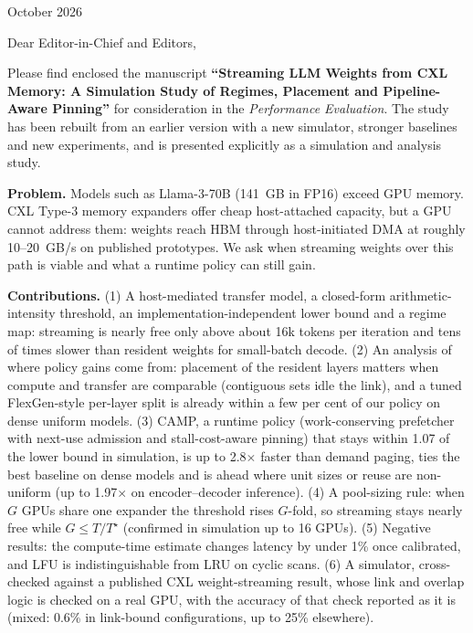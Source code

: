 \documentclass[11pt]{article}
\begin{document}
\begin{flushright}October 2026\end{flushright}

Dear Editor-in-Chief and Editors,

Please find enclosed the manuscript \textbf{``Streaming LLM Weights from CXL Memory: A Simulation Study of Regimes, Placement and Pipeline-Aware Pinning''} for consideration in the \emph{Performance Evaluation}. The study has been rebuilt from an earlier version with a new simulator, stronger baselines and new experiments, and is presented explicitly as a simulation and analysis study.

\textbf{Problem.} Models such as Llama-3-70B (141~GB in FP16) exceed GPU memory. CXL Type-3 memory expanders offer cheap host-attached capacity, but a GPU cannot address them: weights reach HBM through host-initiated DMA at roughly 10--20~GB/s on published prototypes. We ask when streaming weights over this path is viable and what a runtime policy can still gain.

\textbf{Contributions.} (1) A host-mediated transfer model, a closed-form arithmetic-intensity threshold, an implementation-independent lower bound and a regime map: streaming is nearly free only above about 16k tokens per iteration and tens of times slower than resident weights for small-batch decode. (2) An analysis of where policy gains come from: placement of the resident layers matters when compute and transfer are comparable (contiguous sets idle the link), and a tuned FlexGen-style per-layer split is already within a few per cent of our policy on dense uniform models. (3) CAMP, a runtime policy (work-conserving prefetcher with next-use admission and stall-cost-aware pinning) that stays within 1.07 of the lower bound in simulation, is up to 2.8$\times$ faster than demand paging, ties the best baseline on dense models and is ahead where unit sizes or reuse are non-uniform (up to 1.97$\times$ on encoder--decoder inference). (4) A pool-sizing rule: when $G$ GPUs share one expander the threshold rises $G$-fold, so streaming stays nearly free while $G\le T/T^\star$ (confirmed in simulation up to 16 GPUs). (5) Negative results: the compute-time estimate changes latency by under 1\% once calibrated, and LFU is indistinguishable from LRU on cyclic scans. (6) A simulator, cross-checked against a published CXL weight-streaming result, whose link and overlap logic is checked on a real GPU, with the accuracy of that check reported as it is (mixed: 0.6\% in link-bound configurations, up to 25\% elsewhere).
\end{document}

